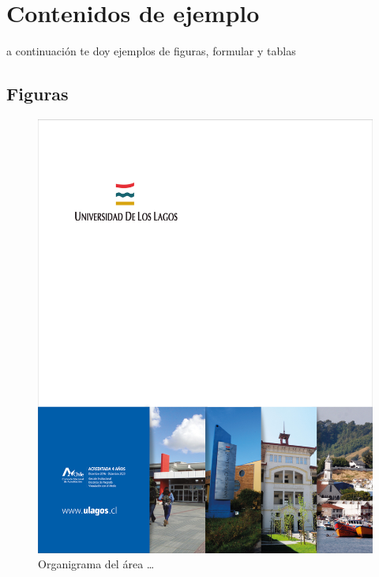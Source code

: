 \chapter{Contenidos de ejemplo}
a continuación te doy ejemplos de figuras, formular y tablas

\section{Figuras}

\blindtext %


\begin{figure}[H]
\centering
 \includegraphics[scale=0.1]{portada}
  \caption{Organigrama del área \dots}
\end{figure}


